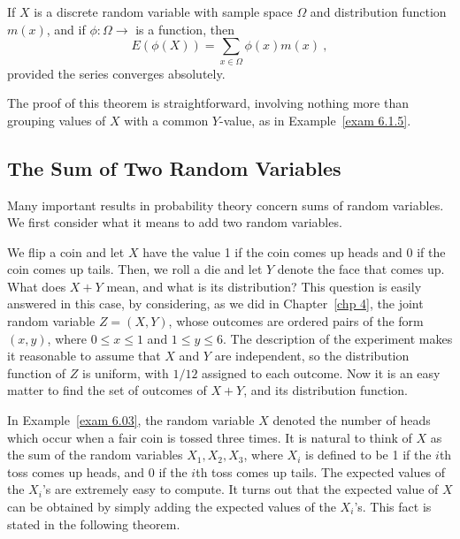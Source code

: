 \begin{theorem}\label{thm 6.3.5} If $X$ is a discrete random variable with sample
space
$\Omega$ and distribution function $m(x)$, and if
$\phi : \Omega \to$  is a function, then 
$$ E(\phi(X)) = \sum_{x \in \Omega} \phi(x) m(x)\ ,
$$  provided the series converges absolutely.
\end{theorem}
 
The proof of this theorem is straightforward, involving nothing more than grouping
values of
$X$ with a common $Y$-value, as in Example~\ref{exam 6.1.5}.

\subsection*{The Sum of Two Random Variables}

Many important results in probability theory concern sums of random variables.  We
first  consider what it means to add two random variables.  

\begin{example}\label{exam 6.06} We flip a coin and let $X$ have the value 1 if the
coin comes up heads and 0 if the coin comes up tails.  Then, we roll a die and let
$Y$ denote the face that comes up.  What does $X+Y$ mean, and what is its
distribution?  This question is easily answered in this case, by considering, as we
did in Chapter~\ref{chp 4}, the joint random variable $Z = (X,Y)$, whose outcomes are
ordered pairs of the form $(x, y)$, where $0 \le x \le 1$ and $1 \le y \le 6$.  The
description of the experiment makes it reasonable to assume that $X$ and $Y$ are
independent, so the distribution function of $Z$ is uniform, with $1/12$ assigned to
each outcome.  Now it is an easy matter to find the set of outcomes of $X+Y$, and its
distribution function.
\end{example}

In Example~\ref{exam 6.03}, the random variable $X$ denoted the number of heads which
occur when a fair coin is tossed three times.  It is natural to think of $X$ as the
sum of the random variables $X_1, X_2, X_3$, where $X_i$ is defined to be 1 if the
$i$th toss comes up heads, and 0 if the $i$th toss comes up tails.  The expected
values of the $X_i$'s are extremely easy to compute.  It turns out that the expected
value of $X$ can be obtained by simply adding the expected values of the $X_i$'s. 
This fact is stated in the following theorem.

